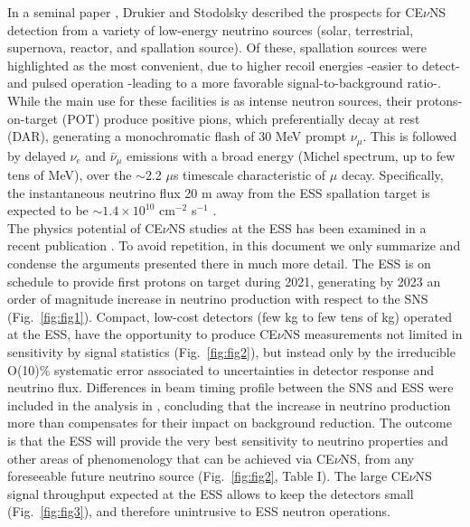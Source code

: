 In a seminal paper \cite{leo}, Drukier and Stodolsky described the prospects for CE$\nu$NS detection from a variety of low-energy neutrino sources (solar, terrestrial, supernova, reactor, and spallation source). Of these, spallation sources were highlighted as the most convenient, due to higher recoil energies -easier to detect- and pulsed operation -leading to a more favorable signal-to-background ratio-. While the main use for these facilities is as intense neutron sources, their protons-on-target (POT) produce positive pions, which preferentially decay at rest (DAR), generating a monochromatic flash of 30 MeV prompt $\nu_{\mu}$. This is followed by delayed  $\nu_{e}$ and $\bar{\nu}_{\mu}$ emissions with a broad energy (Michel spectrum, up to few tens of MeV), over the $\sim$2.2 $\mu$s timescale characteristic of $\mu$ decay. Specifically, the instantaneous neutrino flux 20 m away from the ESS spallation target is expected to be $\sim 1.4\times10^{10}$ cm$^{-2}$ s$^{-1}$ \cite{ESS}.\\


The physics potential of CE$\nu$NS studies at the ESS has been examined in a recent publication \cite{ESS}. To avoid repetition, in this document we only summarize and condense the arguments presented there in much more detail. The ESS is on schedule to provide first protons on target during 2021, generating by 2023 an order of magnitude increase in neutrino production with respect to the SNS (Fig.\ \ref{fig:fig1}).  Compact, low-cost detectors (few kg to few tens of kg) operated at the ESS, have the opportunity to produce CE$\nu$NS measurements not limited in sensitivity by signal statistics (Fig.\ \ref{fig:fig2}), but instead only  by the irreducible O(10)\%  systematic error associated to uncertainties in detector response and neutrino flux.  Differences in beam timing profile between the SNS and ESS were included in the analysis in \cite{ESS}, concluding that the increase in neutrino production more than compensates for their impact on background reduction. The outcome is that the ESS will provide the very best sensitivity to neutrino properties and other areas of phenomenology that can be achieved via CE$\nu$NS, from any foreseeable future neutrino source (Fig.\ \ref{fig:fig2}, Table I). The large CE$\nu$NS signal throughput expected at the ESS allows to keep the detectors small (Fig.\ \ref{fig:fig3}), and therefore unintrusive to ESS neutron operations.\\

